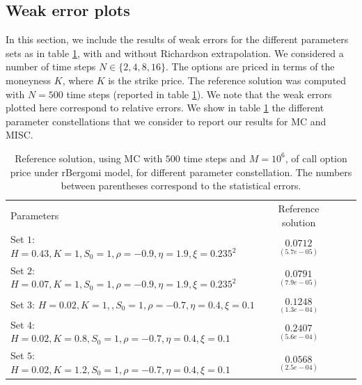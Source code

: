 \begin{enumerate}
	\end{enumerate}

	
	











\subsection{Weak error plots} \label{sec:Weak error plots_no_change}
In this section, we include the results of weak errors for the different parameters sets as in table \ref{table:Reference solution, using MC with $500$ time steps, of Call option price under rBergomi model, for different parameter constellation.}, with and without Richardson extrapolation.  We considered a number of time steps $N \in \{2,4,8,16\}$.  The options are priced in terms of the moneyness $K$, where $K$ is the strike price.  The reference solution was computed with $N=500$ time steps (reported in table \ref{table:Reference solution, using MC with $500$ time steps, of Call option price under rBergomi model, for different parameter constellation.}). We note that the weak errors plotted here correspond to relative errors. We show in table \ref{table:Reference solution, using MC with $500$ time steps, of Call option price under rBergomi model, for different parameter constellation.} the different parameter constellations that we consider to report our results for MC and MISC.



\begin{table}[!h]
	\centering
	\begin{small}
	\begin{tabular}{l*{2}{c}r}
		Parameters            & Reference solution    \\
	Set $1$:	$H=0.43, K=1,S_0=1, \rho=-0.9, \eta=1.9,\xi=0.235^2$   & $\underset{(5.7e-05)}{0.0712}$  \\	
			Set $2$:	$H=0.07, K=1,S_0=1, \rho=-0.9, \eta=1.9,\xi=0.235^2$   & $\underset{(7.9e-05)}{0.0791}$  \\	

				Set $3$:	$H=0.02, K=1,,S_0=1, \rho=-0.7, \eta=0.4,\xi=0.1$   & $\underset{(1.3e-04)}{0.1248}$  \\
					Set $4$:	$H=0.02, K=0.8,S_0=1, \rho=-0.7, \eta=0.4,\xi=0.1$   & $\underset{(5.6e-04)}{0.2407}$  \\
						Set $5$:	$H=0.02, K=1.2,S_0=1, \rho=-0.7, \eta=0.4,\xi=0.1$   & $\underset{(2.5e-04)}{0.0568}$  \\
		\hline
	\end{tabular}
\end{small}
	\caption{Reference solution, using MC with $500$ time steps and $M=10^6$, of call option price under rBergomi model, for different parameter constellation.  The numbers between parentheses correspond to the statistical errors.}
	\label{table:Reference solution, using MC with $500$ time steps, of Call option price under rBergomi model, for different parameter constellation.}
\end{table}

